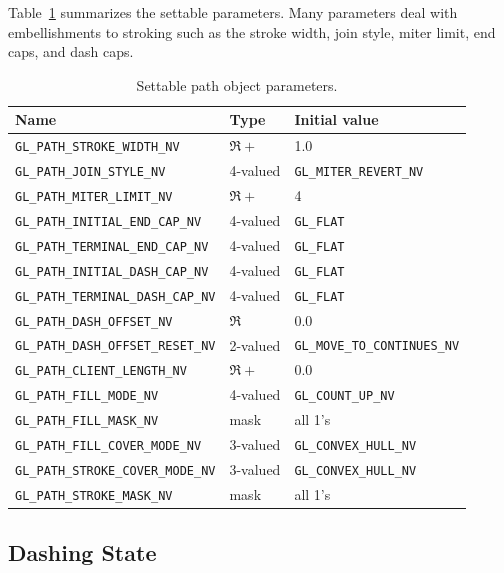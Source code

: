 Table~\ref{tab:parameters} summarizes the settable parameters.  Many
parameters deal with embellishments to stroking such as the stroke width,
join style, miter limit, end caps, and dash caps.
\begin{table}[htb]
\begin{center}
{\small
\begin{tabular}{|l|l|l|}
\hline
{\bf Name} & {\bf Type} & {\bf Initial value} \\
\hline
\hline
{\tt GL\_PATH\_STROKE\_WIDTH\_NV} & $\Re+$ & 1.0 \\
\hline
{\tt GL\_PATH\_JOIN\_STYLE\_NV} & 4-valued & {\tt GL\_MITER\_REVERT\_NV} \\
{\tt GL\_PATH\_MITER\_LIMIT\_NV} & $\Re+$ & 4 \\
\hline
{\tt GL\_PATH\_INITIAL\_END\_CAP\_NV} & 4-valued & {\tt GL\_FLAT} \\
{\tt GL\_PATH\_TERMINAL\_END\_CAP\_NV} & 4-valued & {\tt GL\_FLAT} \\
\hline
{\tt GL\_PATH\_INITIAL\_DASH\_CAP\_NV} & 4-valued & {\tt GL\_FLAT} \\
{\tt GL\_PATH\_TERMINAL\_DASH\_CAP\_NV} & 4-valued & {\tt GL\_FLAT} \\
{\tt GL\_PATH\_DASH\_OFFSET\_NV} & $\Re$ & 0.0 \\
{\tt GL\_PATH\_DASH\_OFFSET\_RESET\_NV} & 2-valued & {\tt GL\_MOVE\_TO\_CONTINUES\_NV} \\
\hline
{\tt GL\_PATH\_CLIENT\_LENGTH\_NV} & $\Re+$ & 0.0 \\
\hline
{\tt GL\_PATH\_FILL\_MODE\_NV} & 4-valued & {\tt GL\_COUNT\_UP\_NV} \\
{\tt GL\_PATH\_FILL\_MASK\_NV} & mask & all 1's \\
{\tt GL\_PATH\_FILL\_COVER\_MODE\_NV} & 3-valued & {\tt GL\_CONVEX\_HULL\_NV} \\
\hline
{\tt GL\_PATH\_STROKE\_COVER\_MODE\_NV} & 3-valued & {\tt GL\_CONVEX\_HULL\_NV} \\
{\tt GL\_PATH\_STROKE\_MASK\_NV} & mask & all 1's \\
\hline
\end{tabular}
}
\end{center}
\caption{Settable path object parameters.}
\label{tab:parameters}
\end{table}

\subsection{Dashing State}

